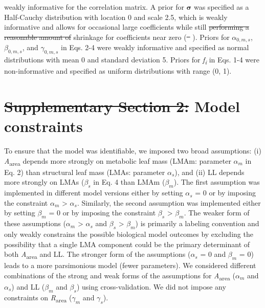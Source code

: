 \documentclass[
  12pt,
  letterpaper,
  DIV=11,
  numbers=noendperiod]{scrartcl}
\numberwithin{equation}{section} %
\providecommand{\DIFadd}[1]{{\protect\color{blue}\uwave{#1}}} %
\providecommand{\DIFdel}[1]{{\protect\color{red}\sout{#1}}}                      %
\providecommand{\DIFaddbegin}{} %
\providecommand{\DIFaddend}{} %
\providecommand{\DIFdelbegin}{} %
\providecommand{\DIFdelend}{} %
\newcommand{\DIFscaledelfig}{0.5}
\newlength{\DIFdelgraphicswidth} %
\newlength{\DIFdelgraphicsheight} %
\newcommand{\DIFaddincludegraphics}[2][]{{\color{blue}\fbox{\DIFOincludegraphics[#1]{#2}}}} %
\newcommand{\DIFdelincludegraphics}[2][]{%
\sbox{\DIFdelgraphicsbox}{\DIFOincludegraphics[#1]{#2}}%
\settoboxwidth{\DIFdelgraphicswidth}{\DIFdelgraphicsbox} %
\settoboxtotalheight{\DIFdelgraphicsheight}{\DIFdelgraphicsbox} %
\scalebox{\DIFscaledelfig}{%
\parbox[b]{\DIFdelgraphicswidth}{\usebox{\DIFdelgraphicsbox}\\[-\baselineskip] \rule{\DIFdelgraphicswidth}{0em}}\llap{\resizebox{\DIFdelgraphicswidth}{\DIFdelgraphicsheight}{%
\setlength{\unitlength}{\DIFdelgraphicswidth}%
\begin{picture}(1,1)%
\thicklines\linethickness{2pt} %
{\color[rgb]{1,0,0}\put(0,0){\framebox(1,1){}}}%
{\color[rgb]{1,0,0}\put(0,0){\line( 1,1){1}}}%
{\color[rgb]{1,0,0}\put(0,1){\line(1,-1){1}}}%
\end{picture}%
}\hspace*{3pt}}} %
} %
\DeclareRobustCommand{\DIFaddbegin}{\DIFOaddbegin \let\includegraphics\DIFaddincludegraphics} %
\DeclareRobustCommand{\DIFaddend}{\DIFOaddend \let\includegraphics\DIFOincludegraphics} %
\DeclareRobustCommand{\DIFdelbegin}{\DIFOdelbegin \let\includegraphics\DIFdelincludegraphics} %
\DeclareRobustCommand{\DIFdelend}{\DIFOaddend \let\includegraphics\DIFOincludegraphics} %
\begin{document}
weakly informative for the correlation matrix. A prior for
\(\boldsymbol{\sigma}\) was specified as a Half-Cauchy distribution with
location 0 and scale 2.5, which is weakly informative and allows for
occasional large coefficients while still \DIFdelbegin \DIFdel{performing a reasonable amount
of }\DIFdelend \DIFaddbegin \DIFadd{providing reasonable }\DIFaddend shrinkage
for coefficients near zero (\DIFdelbegin \DIFdel{\mbox{%
\citeproc{ref-Gelman2008}{Gelman et al., 2008}}\hspace{0pt}%
}\DIFdelend \DIFaddbegin \DIFadd{\mbox{%
\citeproc{ref-Gelman2008}{Gelman et al.
2008}}\hspace{0pt}%
}\DIFaddend ). Priors for \(\alpha_{0,m,s}\), \(\beta_{0,m,s}\), and
\(\gamma_{0,m,s}\) in Eqs. 2-4 were weakly informative and specified as
normal distributions with mean 0 and standard deviation 5. Priors for
\emph{f\textsubscript{i}} in Eqs. 1-4 were non-informative and specified
as uniform distributions with range (0, 1).

\newpage

\section{\DIFdelbegin \DIFdel{Supplementary Section 2: }\DIFdelend Model constraints}\DIFdelbegin %
\DIFdelend \DIFaddbegin \label{model-constraints}
\DIFaddend 

To ensure that the model was identifiable, we imposed two broad
assumptions: (i) \emph{A}\textsubscript{area} depends more strongly on
metabolic leaf mass (LMAm: parameter \(\alpha_m\) in Eq. 2) than \DIFaddbegin \DIFadd{on
}\DIFaddend structural leaf mass (LMAs: parameter \(\alpha_s\)), and (ii) LL depends
more strongly on LMAs (\(\beta_s\) in Eq. 4 than \DIFaddbegin \DIFadd{on }\DIFaddend LMAm (\(\beta_m\)).
The first assumption was implemented in different model versions either
by setting \(\alpha_s\) = 0 or by imposing the constraint \(\alpha_m\)
\textgreater{} \(\alpha_s\). Similarly, the second assumption was
implemented either by setting \(\beta_m\) = 0 or by imposing the
constraint \(\beta_s\) \textgreater{} \(\beta_m\). The weaker form of
these assumptions (\(\alpha_m\) \textgreater{} \(\alpha_s\) and
\(\beta_s\) \textgreater{} \(\beta_m\)) is primarily a labeling
convention and only weakly constrains the possible biological model
outcomes by excluding the possibility that a single LMA component could
be the primary determinant of both \emph{A}\textsubscript{area} and LL.
The stronger form of the assumptions (\(\alpha_s\) = 0 and \(\beta_m\) =
0) leads to a more parsimonious model (fewer parameters). We considered
different combinations of the strong and weak forms of the assumptions
for \emph{A}\textsubscript{area} (\(\alpha_m\) and \(\alpha_s\)) and LL
(\(\beta_m\) and \(\beta_s\)) using cross-validation. We did not impose
any constraints on \emph{R}\textsubscript{area} (\(\gamma_m\) and
\(\gamma_s\)).
\end{document}
